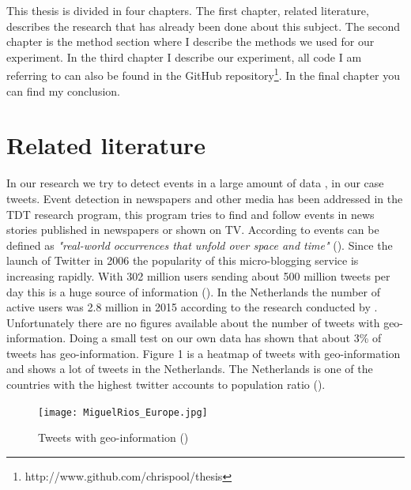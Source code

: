 \documentclass[
10pt, %
a4paper, %
oneside, %
headinclude,footinclude, %
BCOR5mm, %
]{scrartcl}
\begin{document}
\noindent This thesis is divided in four chapters. The first chapter, related literature, describes the research that has already been done about this subject. The second chapter is the method section where I describe the methods we used for our experiment. In the third chapter I describe our experiment, all code I am referring to can also be found in the GitHub repository\footnote{http://www.github.com/chrispool/thesis}. In the final chapter you can find my conclusion.
\newpage
\section{Related literature}
In our research we try to detect events in a large amount of data , in our case tweets. Event detection in newspapers and other media has been addressed in the TDT research program, this program tries to find and follow events in news stories published in newspapers or shown on TV. According to \citet{allan1998topic} events can be defined as \textit{"real-world occurrences that unfold over space and time"} (\citealt{allan1998topic}). 
\vl
Since the launch of Twitter in 2006 the popularity of this micro-blogging service is increasing rapidly. With 302 million users sending about 500 million tweets per day this is a huge source of information (\citealt{statista}). 
In the Netherlands the number of active users was 2.8 million in 2015 according to the research conducted by \citet{newcom}. 
\vl
Unfortunately there are no figures available about the number of tweets with geo-information. Doing a small test on our own data has shown that about 3\% of tweets has geo-information. Figure 1 is a heatmap of tweets with geo-information and shows a lot of tweets in the Netherlands. The Netherlands is one of the countries with the highest twitter accounts to population ratio (\citealt{dawson}).
\begin{figure}[htbp] %
   \centering
   \texttt{[image: MiguelRios\_Europe.jpg]} 
   \caption{Tweets with geo-information (\citealt{rios})}
   \label{fig:example}
\end{figure}
\end{document}
